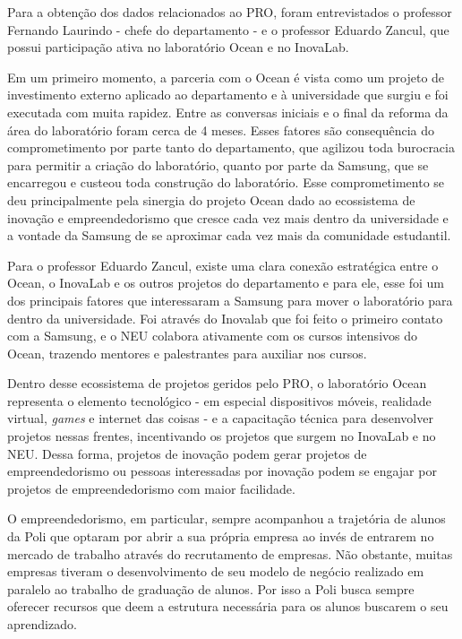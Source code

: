 Para a obtenção dos dados relacionados ao PRO, foram entrevistados o professor Fernando Laurindo - chefe do departamento - e o professor Eduardo Zancul, que possui participação ativa no laboratório Ocean e no InovaLab. 

Em um primeiro momento, a parceria com o Ocean é vista como um projeto de investimento externo aplicado ao departamento e à universidade que surgiu e foi executada com muita rapidez. Entre as conversas iniciais e o final da reforma da área do laboratório foram cerca de 4 meses. Esses fatores são consequência do comprometimento por parte tanto do departamento, que agilizou toda burocracia para permitir a criação do laboratório, quanto por parte da Samsung, que se encarregou e custeou toda construção do laboratório. Esse comprometimento se deu principalmente pela sinergia do projeto Ocean dado ao ecossistema de inovação e empreendedorismo que cresce cada vez mais dentro da universidade e a vontade da Samsung de se aproximar cada vez mais da comunidade estudantil.

Para o professor Eduardo Zancul, existe uma clara conexão estratégica entre o Ocean, o InovaLab e os outros projetos do departamento e para ele, esse foi um dos principais fatores que interessaram a Samsung para mover o laboratório para dentro da universidade. Foi através do Inovalab que foi feito o primeiro contato com a Samsung, e o NEU colabora ativamente com os cursos intensivos do Ocean, trazendo mentores e palestrantes para auxiliar nos cursos. 

Dentro desse ecossistema de projetos geridos pelo PRO, o laboratório Ocean representa o elemento tecnológico - em especial dispositivos móveis, realidade virtual, \textit{games} e internet das coisas - e a capacitação técnica para desenvolver projetos nessas frentes, incentivando os projetos que surgem no InovaLab e no NEU. Dessa forma, projetos de inovação podem gerar projetos de empreendedorismo ou pessoas interessadas por inovação podem se engajar por projetos de empreendedorismo com maior facilidade.

O empreendedorismo, em particular, sempre acompanhou a trajetória de alunos da Poli que optaram por abrir a sua própria empresa ao invés de entrarem no mercado de trabalho através do recrutamento de empresas. Não obstante, muitas empresas tiveram o desenvolvimento de seu modelo de negócio realizado em paralelo ao trabalho de graduação de alunos. Por isso a Poli busca sempre oferecer recursos que deem a estrutura necessária para os alunos buscarem o seu aprendizado.

